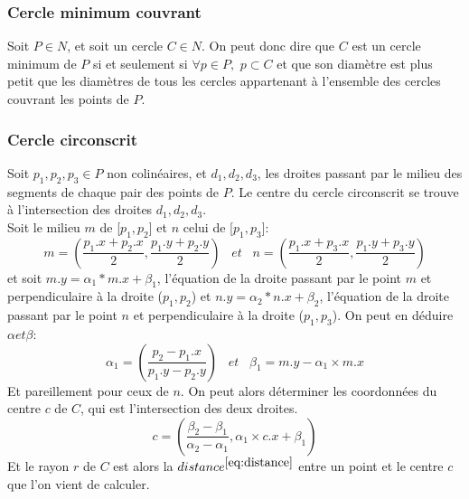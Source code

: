 \documentclass[12pt, a4paper, titlepage]{article}
\begin{document}
        \subsubsection{Cercle minimum couvrant}
         Soit $P \in N$, et soit un cercle $C \in N$. On peut donc dire que $C$ est un cercle minimum de $P$ si et seulement si $\forall p \in P,$ \space $p \subset C$ et que son diamètre est plus petit que les diamètres de tous les cercles appartenant à l'ensemble des cercles couvrant les points de $P$.
         
        \subsubsection{Cercle circonscrit}
        Soit {$p_{1}, p_{2}, p_{3} \in P$} non colinéaires, et $d_{1}, d_{2}, d_{3}$, les droites passant par le milieu des segments de chaque pair des points de $P$. Le centre du cercle circonscrit se trouve à l'intersection des droites $d_{1}, d_{2}, d_{3}$.\\
        Soit le milieu $m$ de [$p_{1},p_{2}$] et $n$ celui de [$p_{1},p_{3}$]:
         \begin{equation}
             m=(\frac{p_{1}.x + p_{2}.x}{2}, \frac{p_{1}.y + p_{2}.y}{2}) \;\;\;et\;\;\; n = (\frac{p_{1}.x + p_{3}.x}{2}, \frac{p_{1}.y + p_{3}.y}{2})
         \end{equation}
        et soit $m.y=\alpha_{1}*m.x + \beta_{1}$, l'équation de la droite passant par le point $m$ et perpendiculaire à la droite ($p_{1},p_{2}$) et $n.y=\alpha_{2}*n.x + \beta_{2}$, l'équation de la droite passant par le point $n$ et perpendiculaire à la droite ($p_{1},p_{3}$). On peut en déduire $\alpha et \beta$:
        \begin{equation}
            \alpha_{1} = (\frac{p_{2} - p_{1}.x}{p_{1}.y - p_{2}.y}) \;\;\;et\;\;\; \beta_{1} = m.y - \alpha_{1} \times m.x
        \end{equation}
        Et pareillement pour ceux de $n$. On peut alors déterminer les coordonnées du centre $c$ de $C$, qui est l'intersection des deux droites. 
        \begin{equation}
            c = ( \frac{\beta_{2} - \beta_{1}}{\alpha_{2} - \alpha_{1}} , \alpha_{1} \times c.x + \beta_{1} )
        \end{equation}
        Et le rayon $r$ de $C$ est alors la $distance^{\eqref{eq:distance}}$ entre un point et le centre $c$ que l'on vient de calculer.
        
\end{document}
